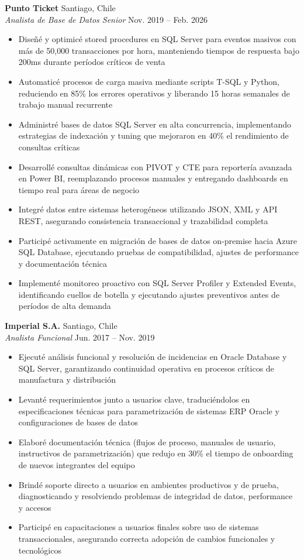 \documentclass[11pt,letterpaper]{article}
\begin{document}
\textbf{Punto Ticket} \hfill Santiago, Chile\\
\textit{Analista de Base de Datos Senior} \hfill Nov. 2019 – Feb. 2026
\begin{itemize}
  \item Diseñé y optimicé stored procedures en SQL Server para eventos masivos con más de 50,000 transacciones por hora, manteniendo tiempos de respuesta bajo 200ms durante períodos críticos de venta
  \item Automaticé procesos de carga masiva mediante scripts T-SQL y Python, reduciendo en 85\% los errores operativos y liberando 15 horas semanales de trabajo manual recurrente
  \item Administré bases de datos SQL Server en alta concurrencia, implementando estrategias de indexación y tuning que mejoraron en 40\% el rendimiento de consultas críticas
  \item Desarrollé consultas dinámicas con PIVOT y CTE para reportería avanzada en Power BI, reemplazando procesos manuales y entregando dashboards en tiempo real para áreas de negocio
  \item Integré datos entre sistemas heterogéneos utilizando JSON, XML y API REST, asegurando consistencia transaccional y trazabilidad completa
  \item Participé activamente en migración de bases de datos on-premise hacia Azure SQL Database, ejecutando pruebas de compatibilidad, ajustes de performance y documentación técnica
  \item Implementé monitoreo proactivo con SQL Server Profiler y Extended Events, identificando cuellos de botella y ejecutando ajustes preventivos antes de períodos de alta demanda
\end{itemize}
\vspace{2pt}
\textbf{Imperial S.A.} \hfill Santiago, Chile\\
\textit{Analista Funcional} \hfill Jun. 2017 – Nov. 2019
\begin{itemize}
  \item Ejecuté análisis funcional y resolución de incidencias en Oracle Database y SQL Server, garantizando continuidad operativa en procesos críticos de manufactura y distribución
  \item Levanté requerimientos junto a usuarios clave, traduciéndolos en especificaciones técnicas para parametrización de sistemas ERP Oracle y configuraciones de bases de datos
  \item Elaboré documentación técnica (flujos de proceso, manuales de usuario, instructivos de parametrización) que redujo en 30\% el tiempo de onboarding de nuevos integrantes del equipo
  \item Brindé soporte directo a usuarios en ambientes productivos y de prueba, diagnosticando y resolviendo problemas de integridad de datos, performance y accesos
  \item Participé en capacitaciones a usuarios finales sobre uso de sistemas transaccionales, asegurando correcta adopción de cambios funcionales y tecnológicos
\end{itemize}
\end{document}
